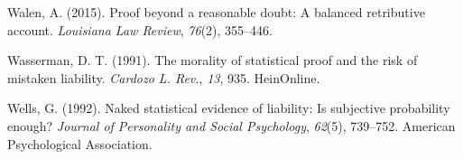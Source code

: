 \documentclass[10pt,dvipsnames,enabledeprecatedfontcommands]{scrartcl}
\begin{document}
\leavevmode\hypertarget{ref-walen2015}{}%
Walen, A. (2015). Proof beyond a reasonable doubt: A balanced
retributive account. \emph{Louisiana Law Review}, \emph{76}(2),
355--446.

\leavevmode\hypertarget{ref-wasserman1991morality}{}%
Wasserman, D. T. (1991). The morality of statistical proof and the risk
of mistaken liability. \emph{Cardozo L. Rev.}, \emph{13}, 935.
HeinOnline.

\leavevmode\hypertarget{ref-wells1992naked}{}%
Wells, G. (1992). Naked statistical evidence of liability: Is subjective
probability enough? \emph{Journal of Personality and Social Psychology},
\emph{62}(5), 739--752. American Psychological Association.
\end{document}
